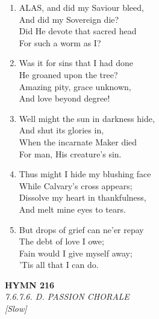 \begin{enumerate}
    \item ALAS, and did my Saviour bleed, \\
            And did my Sovereign die? \\
        Did He devote that sacred head \\
            For such a worm as I?

    \item Was it for sins that I had done \\
            He groaned upon the tree? \\
        Amazing pity, grace unknown, \\
            And love beyond degree!

    \item Well might the sun in darkness hide, \\
            And shut its glories in, \\
        When the incarnate Maker died \\
            For man, His creature's sin.

    \item Thus might I hide my blushing face \\
            While Calvary's cross appears; \\
        Dissolve my heart in thankfulness, \\
            And melt mine eyes to tears.

    \item But drops of grief can ne'er repay \\
            The debt of love I owe; \\
        Fain would I give myself away; \\
            'Tis all that I can do.

\end{enumerate}

\newpage
\begin{center}
    {\Large \textbf{HYMN 216}}
    \\
    \textit{7.6.7.6. D. PASSION CHORALE}
    \\
    \textit{\small [Slow]}
\end{center}
\vspace{1em}

